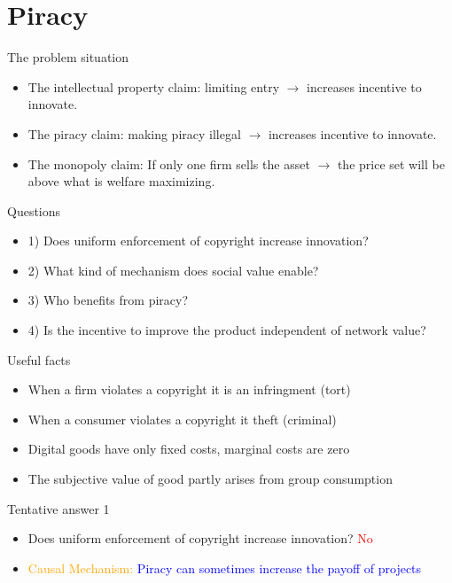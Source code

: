 \documentclass{beamer}
\numberwithin{equation}{section}
\begin{document}
\section{Piracy}
\begin{frame}{The problem situation}
\begin{itemize}
    \item The intellectual property claim: limiting entry $\rightarrow$ increases incentive to innovate.
    \item The piracy claim: making piracy illegal $\rightarrow$ increases incentive to innovate.
    \item The monopoly claim: If only one firm sells the asset $\rightarrow$ the price set will be above what is welfare maximizing. 
\end{itemize}
\end{frame}
\begin{frame}{Questions}
\begin{itemize}
    \item 1) Does uniform enforcement of copyright increase innovation?
    \item 2) What kind of mechanism does social value enable? 
    \item 3) Who benefits from piracy? 
    \item 4) Is the incentive to improve the product independent of network value? 
\end{itemize}
\end{frame}
\begin{frame}{Useful facts}
\begin{itemize} 
    \item When a firm violates a copyright it is an infringment (tort) 
    \item When a consumer violates a copyright it theft (criminal)
    \item Digital goods have only fixed costs, marginal costs are zero
    \item The subjective value of good partly arises from group consumption
\end{itemize}
\end{frame}
\begin{frame}{Tentative answer 1}
\begin{itemize}
    \item Does uniform enforcement of copyright increase innovation? \textcolor{red}{No}
    \item \textcolor{orange}{Causal Mechanism:} \textcolor{blue}{Piracy can sometimes increase the payoff of projects}
\end{itemize}
\end{frame}
\end{document}
